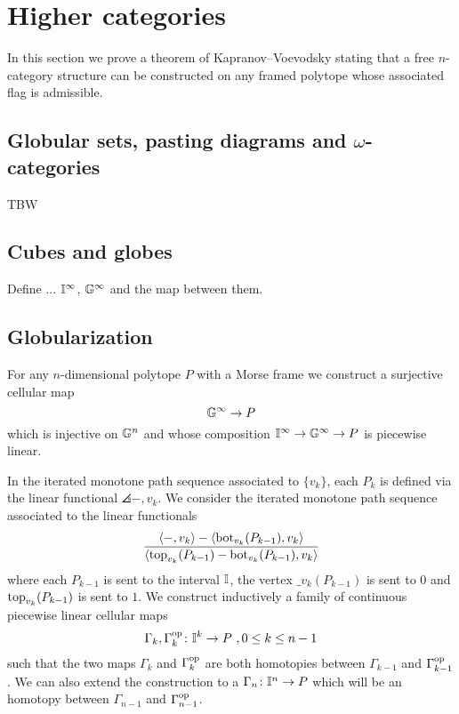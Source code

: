 
\section{Higher categories}

In this section we prove a theorem of Kapranov--Voevodsky \cite{kapranov1991polycategory} stating that a free $n$-category structure can be constructed on any framed polytope whose associated flag is admissible.

\subsection{Globular sets, pasting diagrams and $\omega$-categories}

TBW

\subsection{Cubes and globes}

Define ... $\mathbb{I}^\infty$, $\mathbb{G}^\infty$ and the map between them.

\subsection{Globularization} \label{ss:globularization}

For any $n$-dimensional polytope $P$ with a Morse frame we construct a surjective cellular map
\[
\mathbb{G}^\infty \to P
\]
which is injective on $\mathbb{G}^n$ and whose composition $\mathbb{I}^\infty \to \mathbb{G}^\infty \to P$ is piecewise linear.

In the iterated monotone path sequence associated to $\{v_k\}$, each $P_k$ is defined via the linear functional $\angles{-,v_k}$.
We consider the iterated monotone path sequence associated to the linear functionals
\begin{equation} \label{eq:new-projection}
	\frac{\langle-,v_k\rangle-\langle\operatorname{bot}_{v_k}(P_{k-1}),v_k\rangle}{\langle\operatorname{top}_{v_k}(P_{k-1})-\operatorname{bot}_{v_k}(P_{k-1}),v_k\rangle}
\end{equation}
where each $P_{k-1}$ is sent to the interval $\mathbb{I}$, the vertex $\bm_{v_k}(P_{k-1})$ is sent to $0$ and $\operatorname{top}_{v_k}(P_{k-1})$ is sent to $1$.
We construct inductively a family of continuous piecewise linear cellular maps
\[
\Gamma_k, \Gamma_k^{\mathrm{op}} \colon \mathbb{I}^k \to P \ , 0 \leq k \leq n-1
\]
such that the two maps $\Gamma_k$ and $\Gamma_k^{\mathrm{op}}$ are both homotopies between $\Gamma_{k-1}$ and $\Gamma_{k-1}^{\mathrm{op}}$.
We can also extend the construction to a $\Gamma_n \colon \mathbb{I}^n \to P$ which will be an homotopy between $\Gamma_{n-1}$ and $\Gamma_{n-1}^{\mathrm{op}}$.


